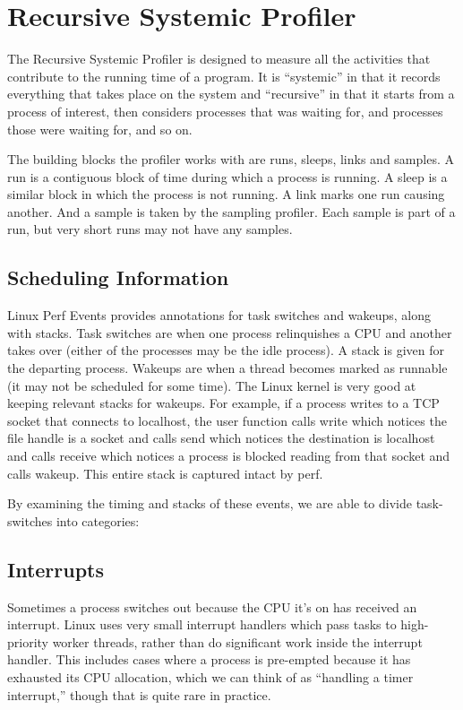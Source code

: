 \documentclass[10pt]{article}
\begin{document}
\section{Recursive Systemic Profiler}

The Recursive Systemic Profiler is designed to measure all the activities that contribute to the running time of a program.  It is ``systemic'' in that it records everything that takes place on the system and ``recursive'' in that it starts from a process of interest, then considers processes that was waiting for, and processes those were waiting for, and so on.

The building blocks the profiler works with are runs, sleeps, links and samples.  A run is a contiguous block of time during which a process is running.  A sleep is a similar block in which the process is not running.  A link marks one run causing another.  And a sample is taken by the sampling profiler.  Each sample is part of a run, but very short runs may not have any samples.

\subsection{Scheduling Information}

Linux Perf Events provides annotations for task switches and wakeups, along with stacks.  Task switches are when one process relinquishes a CPU and another takes over (either of the processes may be the idle process).  A stack is given for the departing process.  Wakeups are when a thread becomes marked as runnable (it may not be scheduled for some time).  The Linux kernel is very good at keeping relevant stacks for wakeups.  For example, if a process writes to a TCP socket that connects to localhost, the user function calls write which notices the file handle is a socket and calls send which notices the destination is localhost and calls receive which notices a process is blocked reading from that socket and calls wakeup.  This entire stack is captured intact by perf.

By examining the timing and stacks of these events, we are able to divide task-switches into categories:

\subsection{Interrupts}

Sometimes a process switches out because the CPU it's on has received an interrupt.  Linux uses very small interrupt handlers which pass tasks to high-priority worker threads, rather than do significant work inside the interrupt handler.  This includes cases where a process is pre-empted because it has exhausted its CPU allocation, which we can think of as ``handling a timer interrupt,'' though that is quite rare in practice.
\end{document}
